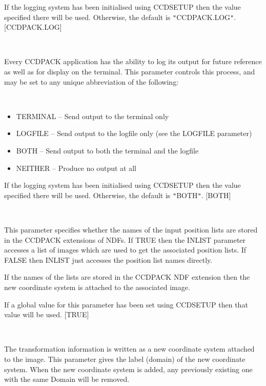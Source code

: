 \documentclass[twoside,11pt]{article}
\newcommand{\htmlref}[2]{#1}
\renewcommand{\_}{\texttt{\symbol{95}}}
\newcommand{\qt}[1]{{\tt "}#1{\tt "}}
\newcommand{\xroutine}[1]{\htmlref{{\sc #1}}{#1}}
\newcommand{\sstsubsection}[1]{ \item[{#1}] \mbox{} \\}
\newcommand{\sstitemlist}[1]{
  \mbox{} \\
  \vspace{-3.5ex}
  \begin{itemize}
     #1
  \end{itemize}
}
\newcommand{\sstitem}{\item}
\newcommand{\sstsubsection}[1]{\item[{#1}]}
\newcommand{\sstitemlist}[1]{
      \begin{itemize}
         #1
      \end{itemize}
      \\
   }
\newcommand{\sstitem}{\item}
\begin{document}
{{{         If the logging system has been initialised using \xroutine{CCDSETUP}
         then the value specified there will be used. Otherwise, the
         default is \qt{CCDPACK.LOG}.
         [CCDPACK.LOG]
      }
      \sstsubsection{
         LOGTO = LITERAL (Read)
      } {
         Every CCDPACK application has the ability to log its output
         for future reference as well as for display on the terminal.
         This parameter controls this process, and may be set to any
         unique abbreviation of the following:
         \sstitemlist{

            \sstitem
               TERMINAL  -- Send output to the terminal only

            \sstitem
               LOGFILE   -- Send output to the logfile only (see the
                               LOGFILE parameter)

            \sstitem
               BOTH      -- Send output to both the terminal and the
                               logfile

            \sstitem
               NEITHER   -- Produce no output at all

         }
         If the logging system has been initialised using \xroutine{CCDSETUP}
         then the value specified there will be used. Otherwise, the
         default is \qt{BOTH}.
         [BOTH]
      }
      \sstsubsection{
         NDFNAMES = \_LOGICAL (Read)
      } {
         This parameter specifies whether the names of the input
         position lists are stored in the CCDPACK extensions of NDFs.
         If TRUE then the INLIST parameter accesses a list of images
         which are used to get the associated position lists. If FALSE
         then INLIST just accesses the position list names directly.

         If the names of the lists are stored in the CCDPACK NDF
         extension then the new coordinate system is attached to
         the associated image.

         If a global value for this parameter has been set using
         \xroutine{CCDSETUP} then that value will be used.
         [TRUE]
      }
      \sstsubsection{
         OUTDOMAIN = LITERAL (Read)
      }{
         The transformation information is written as a new coordinate
         system attached to the image.  This parameter gives the label
         (domain) of the new coordinate system.  When the new
         coordinate system is added, any previously existing one with
         the same Domain will be removed.

}}}
\end{document}
